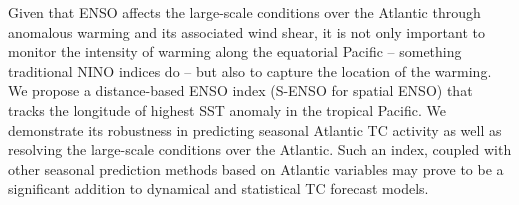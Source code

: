 Given that ENSO affects the large-scale conditions over the Atlantic through anomalous warming and its associated wind shear, it is not only important to monitor the intensity of warming along the equatorial Pacific -- something traditional NINO indices do -- but also to capture the location of the warming. We propose a distance-based ENSO index (S-ENSO for spatial ENSO) that tracks the longitude of highest SST anomaly in the tropical Pacific. We demonstrate its robustness in predicting seasonal Atlantic TC activity as well as resolving the large-scale conditions over the Atlantic. Such an index, coupled with other seasonal prediction methods based on Atlantic variables may prove to be a significant addition to dynamical and statistical TC forecast models.

\newpage

% 








